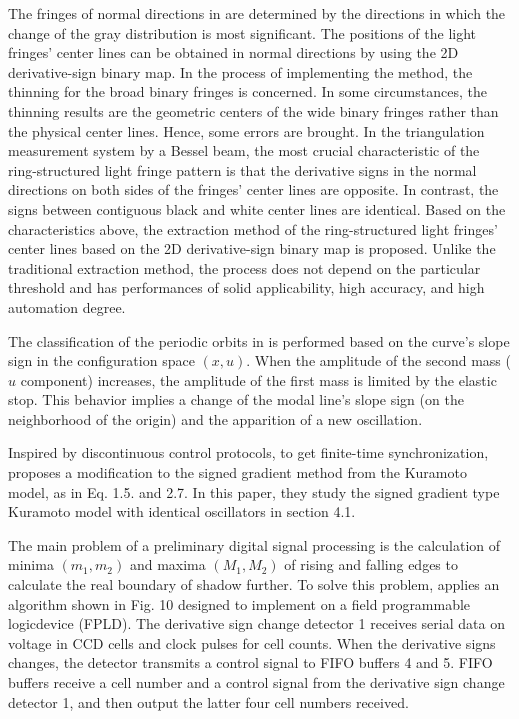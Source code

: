 \documentclass[11pt]{book}
\begin{document}
The fringes of normal directions in \cite{wang2009method} are determined
by the directions in which the change of the gray distribution is
most significant. The positions of the light fringes' center lines
can be obtained in normal directions by using the 2D derivative-sign
binary map. In the process of implementing the method, the thinning
for the broad binary fringes is concerned. In some circumstances,
the thinning results are the geometric centers of the wide binary
fringes rather than the physical center lines. Hence, some errors
are brought. In the triangulation measurement system by a Bessel beam,
the most crucial characteristic of the ring-structured light fringe
pattern is that the derivative signs in the normal directions on both
sides of the fringes' center lines are opposite. In contrast, the
signs between contiguous black and white center lines are identical.
Based on the characteristics above, the extraction method of the ring-structured
light fringes' center lines based on the 2D derivative-sign binary
map is proposed. Unlike the traditional extraction method, the process
does not depend on the particular threshold and has performances of
solid applicability, high accuracy, and high automation degree.

The classification of the periodic orbits in \cite{moussi2015nonlinear}
is performed based on the curve's slope sign in the configuration
space $\left(x,u\right)$. When the amplitude of the second mass ($u$
component) increases, the amplitude of the first mass is limited by
the elastic stop. This behavior implies a change of the modal line's
slope sign (on the neighborhood of the origin) and the apparition
of a new oscillation.

Inspired by discontinuous control protocols, to get finite-time synchronization,
\cite{dong2015finite} proposes a modification to the signed gradient
method from the Kuramoto model, as in Eq. 1.5. and 2.7. In this paper,
they study the signed gradient type Kuramoto model with identical
oscillators in section 4.1.

The main problem of a preliminary digital signal processing is the
calculation of minima $\left(m_{1},m_{2}\right)$ and maxima $\left(M_{1},M_{2}\right)$
of rising and falling edges to calculate the real boundary of shadow
further. To solve this problem, \cite{chursin2015methods} applies
an algorithm shown in Fig. 10 designed to implement on a field programmable
logicdevice (FPLD). The derivative sign change detector 1 receives
serial data on voltage in CCD cells and clock pulses for cell counts.
When the derivative signs changes, the detector transmits a control
signal to FIFO buffers 4 and 5. FIFO buffers receive a cell number
and a control signal from the derivative sign change detector 1, and
then output the latter four cell numbers received.
\end{document}
